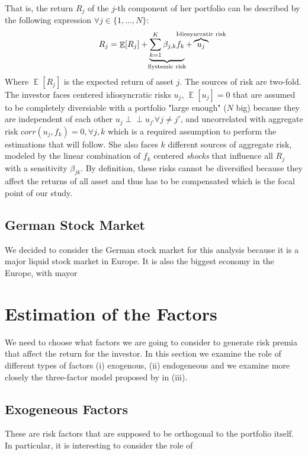 \documentclass[hidelinks,11pts]{article}
\DeclareMathOperator{\E}{\mathbb{E}}
\DeclareMathOperator{\1}{\mathbbm{1}}
\newcommand{\ind}{\perp\!\!\!\!\perp}
\begin{document}
That is, the return $R_j$ of the $j$-th component of her portfolio can be described by the following expression $\forall j\in \{1,...,N\}$: 
    \begin{equation} \label{eq:factorialmodel}
        R_j = \E[R_j] + \underbrace{\sum_{k=1}^K \beta_{j,k} f_k}_{\mathclap{\text{Systemic risk}}} + \overbrace{u_j}^{\mathclap{\text{Idiosyncratic risk}}}
    \end{equation}
Where $\E[R_j]$ is the expected return of asset $j$. 
The sources of risk are two-fold. 
The investor faces centered idiosyncratic risks $u_j$, $\E[u_j]=0$ that are assumed to be completely diversiable with a portfolio "large enough" ($N$ big) because they are independent of each other $u_j \ind u_{j'} \forall j\neq j' $, and uncorrelated with aggregate risk $corr(u_j, f_k) = 0, \forall j, k$ which is a required assumption to perform the estimations that will follow.
She also faces $k$ different sources of aggregate risk, modeled by the linear combination of $f_k$ centered \emph{shocks} that influence all $R_j$ with a sensitivity $\beta_{jk}$. 
By definition, these risks cannot be diversified because they affect the returns of all asset and thus has to be compensated which is the focal point of our study. 



    \subsection{German Stock Market}
We decided to consider the German stock market for this analysis because it is a major liquid stock market in Europe. It is also the biggest economy in the Europe, with mayor 





\section{Estimation of the Factors}

We need to choose what factors we are going to consider to generate risk premia that affect the return for the investor. In this section we examine the role of different types of factors (i) exogenous, (ii) endogeneous and we examine more closely the three-factor model proposed by \cite{famaCommonRiskFactors1993} in (iii).



    \subsection{Exogeneous Factors}
These are risk factors that are supposed to be orthogonal to the portfolio itself. 
In particular, it is interesting to consider the role of 
\end{document}
